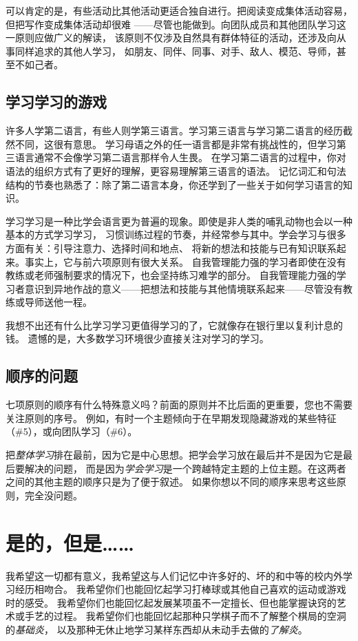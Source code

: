 可以肯定的是，有些活动比其他活动更适合独自进行。把阅读变成集体活动容易，但把写作变成集体活动却很难
——尽管也能做到。向团队成员和其他团队学习这一原则应做广义的解读，
该原则不仅涉及自然具有群体特征的活动，还涉及向从事同样追求的其他人学习，
如朋友、同伴、同事、对手、敌人、模范、导师，甚至不如己者。

\subsection*{学习学习的游戏}
许多人学第二语言，有些人则学第三语言。学习第三语言与学习第二语言的经历截然不同，这很有意思。
学习母语之外的任一语言都是非常有挑战性的，但学习第三语言通常不会像学习第二语言那样令人生畏。
在学习第二语言的过程中，你对语法的组织方式有了更好的理解，更容易理解第三语言的语法。
记忆词汇和句法结构的节奏也熟悉了：除了第二语言本身，你还学到了一些关于如何学习语言的知识。

学习学习是一种比学会语言更为普遍的现象。即使是非人类的哺乳动物也会以一种基本的方式学习学习，
习惯训练过程的节奏，并经常参与其中。学会学习与很多方面有关：引导注意力、选择时间和地点、
将新的想法和技能与已有知识联系起来。事实上，它与前六项原则有很大关系。
自我管理能力强的学习者即使在没有教练或老师强制要求的情况下，也会坚持练习难学的部分。
自我管理能力强的学习者意识到异地作战的意义——把想法和技能与其他情境联系起来——尽管没有教练或导师送他一程。

我想不出还有什么比学习学习更值得学习的了，它就像存在银行里以复利计息的钱。
遗憾的是，大多数学习环境很少直接关注对学习的学习。

\subsection*{顺序的问题}
七项原则的顺序有什么特殊意义吗？前面的原则并不比后面的更重要，您也不需要关注原则的序号。
例如，有时一个主题倾向于在早期发现隐藏游戏的某些特征（\#5），或向团队学习（\#6）。

把\textit{整体学习}排在最前，因为它是中心思想。把学会学习放在最后并不是因为它是最后要解决的问题，
而是因为\textit{学会学习}是一个跨越特定主题的上位主题。在这两者之间的其他主题的顺序只是为了便于叙述。
如果你想以不同的顺序来思考这些原则，完全没问题。

\section*{是的，但是……}

我希望这一切都有意义，我希望这与人们记忆中许多好的、坏的和中等的校内外学习经历相吻合。
我希望你们也能回忆起学习打棒球或其他自己喜欢的运动或游戏时的感受。
我希望你们也能回忆起发展某项虽不一定擅长、但也能掌握诀窍的艺术或手艺的过程。
我希望你们也能回忆起那种只学棋子而不了解整个棋局的空洞的\textit{基础炎}，
以及那种无休止地学习某样东西却从未动手去做的\textit{了解炎}。

